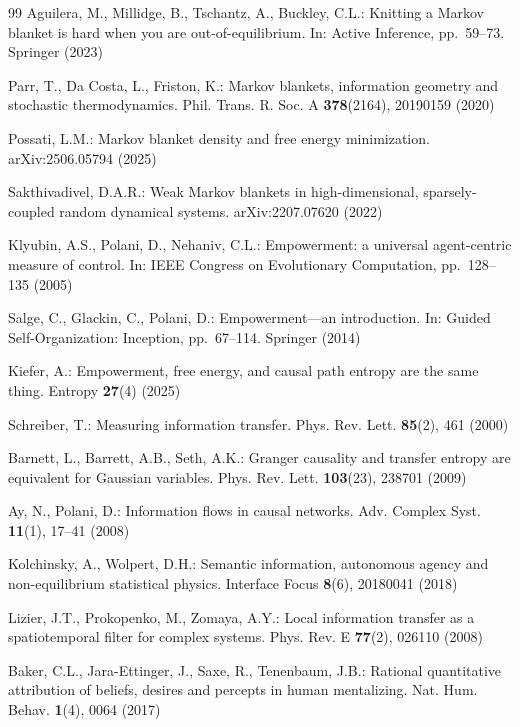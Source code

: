 \documentclass[runningheads]{llncs}
\begin{document}
\begin{thebibliography}{99}
Aguilera, M., Millidge, B., Tschantz, A., Buckley, C.L.: Knitting a Markov blanket is hard when you are out-of-equilibrium. In: Active Inference, pp.~59--73. Springer (2023)

Parr, T., Da Costa, L., Friston, K.: Markov blankets, information geometry and stochastic thermodynamics. Phil. Trans. R. Soc. A \textbf{378}(2164), 20190159 (2020)

Possati, L.M.: Markov blanket density and free energy minimization. arXiv:2506.05794 (2025)

Sakthivadivel, D.A.R.: Weak Markov blankets in high-dimensional, sparsely-coupled random dynamical systems. arXiv:2207.07620 (2022)

Klyubin, A.S., Polani, D., Nehaniv, C.L.: Empowerment: a universal agent-centric measure of control. In: IEEE Congress on Evolutionary Computation, pp.~128--135 (2005)

Salge, C., Glackin, C., Polani, D.: Empowerment---an introduction. In: Guided Self-Organization: Inception, pp.~67--114. Springer (2014)

Kiefer, A.: Empowerment, free energy, and causal path entropy are the same thing. Entropy \textbf{27}(4) (2025)

Schreiber, T.: Measuring information transfer. Phys. Rev. Lett. \textbf{85}(2), 461 (2000)

Barnett, L., Barrett, A.B., Seth, A.K.: Granger causality and transfer entropy are equivalent for Gaussian variables. Phys. Rev. Lett. \textbf{103}(23), 238701 (2009)

Ay, N., Polani, D.: Information flows in causal networks. Adv. Complex Syst. \textbf{11}(1), 17--41 (2008)

Kolchinsky, A., Wolpert, D.H.: Semantic information, autonomous agency and non-equilibrium statistical physics. Interface Focus \textbf{8}(6), 20180041 (2018)

Lizier, J.T., Prokopenko, M., Zomaya, A.Y.: Local information transfer as a spatiotemporal filter for complex systems. Phys. Rev. E \textbf{77}(2), 026110 (2008)

Baker, C.L., Jara-Ettinger, J., Saxe, R., Tenenbaum, J.B.: Rational quantitative attribution of beliefs, desires and percepts in human mentalizing. Nat. Hum. Behav. \textbf{1}(4), 0064 (2017)


\end{thebibliography}
\end{document}
